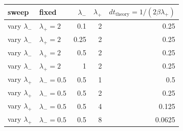 \begin{tabular}{llrrr}
\toprule
sweep & fixed & $\lambda_-$ & $\lambda_+$ & $dt_{\mathrm{theory}}=1/(2\beta\lambda_+)$ \\
\midrule
vary $\lambda_-$ & $\lambda_+=2$ & 0.1 & 2 & 0.25 \\
vary $\lambda_-$ & $\lambda_+=2$ & 0.25 & 2 & 0.25 \\
vary $\lambda_-$ & $\lambda_+=2$ & 0.5 & 2 & 0.25 \\
vary $\lambda_-$ & $\lambda_+=2$ & 1 & 2 & 0.25 \\
\midrule
vary $\lambda_+$ & $\lambda_-=0.5$ & 0.5 & 1 & 0.5 \\
vary $\lambda_+$ & $\lambda_-=0.5$ & 0.5 & 2 & 0.25 \\
vary $\lambda_+$ & $\lambda_-=0.5$ & 0.5 & 4 & 0.125 \\
vary $\lambda_+$ & $\lambda_-=0.5$ & 0.5 & 8 & 0.0625 \\
\bottomrule
\end{tabular}
